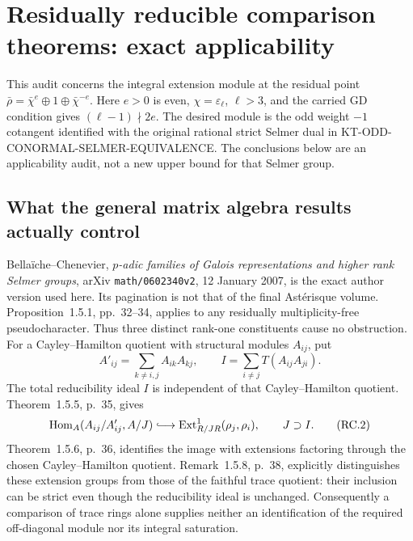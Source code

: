\section{Residually reducible comparison theorems: exact applicability}
\label{sec:kt-reducible-comparison}

This audit concerns the integral extension module at the residual
point $\bar\rho=\bar\chi^e\oplus1\oplus\bar\chi^{-e}$.
Here $e>0$ is even, $\chi=\varepsilon_\ell$, $\ell>3$, and the
carried GD condition gives $(\ell-1)\nmid2e$.  The desired module
is the odd weight $-1$ cotangent identified with the original
rational strict Selmer dual in KT-ODD-CONORMAL-SELMER-EQUIVALENCE.
The conclusions below are an applicability audit, not a new
upper bound for that Selmer group.

\subsection{What the general matrix algebra results actually control}

Bella\"iche--Chenevier, \emph{$p$-adic families of Galois
representations and higher rank Selmer groups}, arXiv
\texttt{math/0602340v2}, 12 January 2007, is the exact author
version used here.  Its pagination is not that of the final
Ast\'erisque volume.  Proposition~1.5.1, pp.~32--34, applies
to any residually multiplicity-free pseudocharacter.  Thus
three distinct rank-one constituents cause no obstruction.
For a Cayley--Hamilton quotient with structural modules $A_{ij}$,
put
\[
 A'_{ij}=\sum_{k\ne i,j}A_{ik}A_{kj},\qquad
 I=\sum_{i\ne j}T(A_{ij}A_{ji}).                         \tag{RC.1}
\]
The total reducibility ideal $I$ is independent of that
Cayley--Hamilton quotient.  Theorem~1.5.5, p.~35, gives
\[
 \operatorname{Hom}_A(A_{ij}/A'_{ij},A/J)
       \lhook\joinrel\longrightarrow
       \operatorname{Ext}^1_{R/JR}(\rho_j,\rho_i),
       \qquad J\supset I.                                \tag{RC.2}
\]
Theorem~1.5.6, p.~36, identifies the image with extensions
factoring through the chosen Cayley--Hamilton quotient.
Remark~1.5.8, p.~38, explicitly distinguishes these extension
groups from those of the faithful trace quotient: their
inclusion can be strict even though the reducibility ideal
is unchanged.  Consequently a comparison of trace rings
alone supplies neither an identification of the required
off-diagonal module nor its integral saturation.

